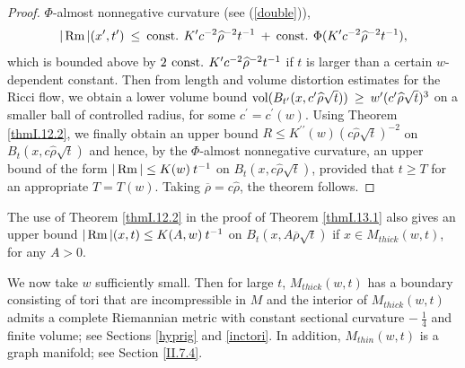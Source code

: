 \begin{proof}
$\Phi$-almost nonnegative curvature (see (\ref{double})),
\begin{equation}
|\operatorname{Rm}|(x^\prime, t^\prime) \: \le \: \operatorname{const.} \:
K^\prime c^{-2} \widehat{\rho}^{-2} t^{-1} \: + \: \operatorname{const.} \:
\Phi(K^\prime c^{-2} \widehat{\rho}^{-2} t^{-1}),
\end{equation}
which is bounded above by $2 \: \operatorname{const.} \: K^\prime c^{-2} \widehat{\rho}^{-2} t^{-1}$
if $t$ is larger than a certain
$w$-dependent constant. Then from length and volume distortion estimates
for the Ricci flow,
we obtain a lower volume bound
$\operatorname{vol}(B_{t^\prime}(x, c^\prime \widehat{\rho} \sqrt{t}))   \: \ge \:
w^{\prime} ( c^\prime \widehat{\rho} \sqrt{t})^3$ on a smaller ball of
controlled radius, for
some $c^\prime = c^\prime(w)$.  Using Theorem \ref{thmI.12.2}, we finally
obtain an upper bound $R \le K^{\prime \prime}(w) (c\widehat{\rho} \sqrt{t})^{-2}$
on  $B_t(x, c\widehat{\rho} \sqrt{t})$ and hence,
by the $\Phi$-almost nonnegative curvature, an upper bound of the form
$|\operatorname{Rm}| \le K(w) \: t^{-1}$ on $B_t(x, c\widehat{\rho} \sqrt{t})$,
provided that $t \ge T$ for an appropriate $T = T(w)$.
Taking $\overline{\rho} = c \widehat{\rho}$, the theorem follows.
\end{proof}

\begin{remark}
  \label{rem:kl-thick-thin-decomposition-nonsingular-flows-estimates-thick-thin-geometry}

The use of Theorem \ref{thmI.12.2} in the proof of Theorem \ref{thmI.13.1}
also gives an upper bound $|\operatorname{Rm}|(x,t) \le K(A,w) \: t^{-1}$ on
$B_t(x, A \overline{\rho} \sqrt{t})$ if $x \in M_{thick}(w,t)$, for any $A > 0$.
\end{remark}

We now take $w$ sufficiently small. Then for large $t$, $M_{thick}(w,t)$ has a boundary
consisting of tori that are incompressible in $M$ and the interior of
$M_{thick}(w,t)$ admits a complete Riemannian metric with constant
sectional curvature $- \: \frac14$ and finite volume; see
Sections
\ref{hyprig} and \ref{inctori}. In addition,
$M_{thin}(w,t)$ is a graph manifold; see
Section \ref{II.7.4}.
